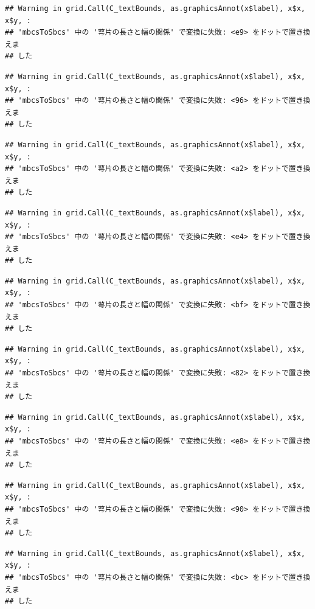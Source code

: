 \documentclass[
]{book}
\begin{document}
\begin{verbatim}
## Warning in grid.Call(C_textBounds, as.graphicsAnnot(x$label), x$x, x$y, :
## 'mbcsToSbcs' 中の '萼片の長さと幅の関係' で変換に失敗: <e9> をドットで置き換えま
## した
\end{verbatim}

\begin{verbatim}
## Warning in grid.Call(C_textBounds, as.graphicsAnnot(x$label), x$x, x$y, :
## 'mbcsToSbcs' 中の '萼片の長さと幅の関係' で変換に失敗: <96> をドットで置き換えま
## した
\end{verbatim}

\begin{verbatim}
## Warning in grid.Call(C_textBounds, as.graphicsAnnot(x$label), x$x, x$y, :
## 'mbcsToSbcs' 中の '萼片の長さと幅の関係' で変換に失敗: <a2> をドットで置き換えま
## した
\end{verbatim}

\begin{verbatim}
## Warning in grid.Call(C_textBounds, as.graphicsAnnot(x$label), x$x, x$y, :
## 'mbcsToSbcs' 中の '萼片の長さと幅の関係' で変換に失敗: <e4> をドットで置き換えま
## した
\end{verbatim}

\begin{verbatim}
## Warning in grid.Call(C_textBounds, as.graphicsAnnot(x$label), x$x, x$y, :
## 'mbcsToSbcs' 中の '萼片の長さと幅の関係' で変換に失敗: <bf> をドットで置き換えま
## した
\end{verbatim}

\begin{verbatim}
## Warning in grid.Call(C_textBounds, as.graphicsAnnot(x$label), x$x, x$y, :
## 'mbcsToSbcs' 中の '萼片の長さと幅の関係' で変換に失敗: <82> をドットで置き換えま
## した
\end{verbatim}

\begin{verbatim}
## Warning in grid.Call(C_textBounds, as.graphicsAnnot(x$label), x$x, x$y, :
## 'mbcsToSbcs' 中の '萼片の長さと幅の関係' で変換に失敗: <e8> をドットで置き換えま
## した
\end{verbatim}

\begin{verbatim}
## Warning in grid.Call(C_textBounds, as.graphicsAnnot(x$label), x$x, x$y, :
## 'mbcsToSbcs' 中の '萼片の長さと幅の関係' で変換に失敗: <90> をドットで置き換えま
## した
\end{verbatim}

\begin{verbatim}
## Warning in grid.Call(C_textBounds, as.graphicsAnnot(x$label), x$x, x$y, :
## 'mbcsToSbcs' 中の '萼片の長さと幅の関係' で変換に失敗: <bc> をドットで置き換えま
## した
\end{verbatim}
\end{document}
